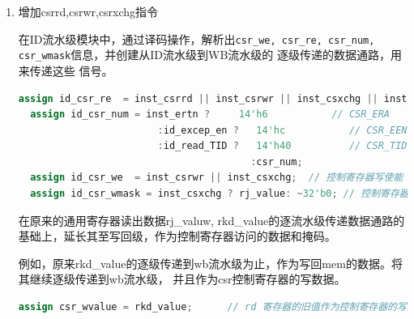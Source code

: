 \documentclass[11pt]{article}
\begin{document}
\begin{enumerate}
\begin{lstlisting}[language=verilog]
/*---------------------------TVAL------------------------------------------------------*/           //add TVAL
assign tcfg_next_value = csr_wmask[31:0] & csr_wvalue[31:0]
                        | ~csr_wmask[31:0] & {csr_tcfg_initval,csr_tcfg_periodic,csr_tcfg_en};      //value of TCFG in the next clk

always @(posedge clk)begin
    if(~resetn)
        timer_cnt <= 32'hffffffff;
    else if(csr_we && csr_num==`CSR_TCFG && tcfg_next_value[`CSR_TCFG_EN])
        timer_cnt <= {tcfg_next_value[`CSR_TCFG_INITV],2'b0};
    else if(csr_tcfg_en && timer_cnt!=32'hffffffff) begin
        if(timer_cnt[31:0]==32'b0 && csr_tcfg_periodic)
            timer_cnt <= {csr_tcfg_initval,2'b0};
        else
            timer_cnt <= timer_cnt -1'b1;
    end
end

assign csr_tval = timer_cnt[31:0];

/*---------------------------TICLR------------------------------------------------------*/           //add TICLR
assign csr_ticlr_clr = 1'b0;
\end{lstlisting}

\item 增加csrrd,csrwr,csrxchg指令

在ID流水级模块中，通过译码操作，解析出\verb|csr_we, csr_re, csr_num, csr_wmask|信息，并创建从ID流水级到WB流水级的
逐级传递的数据通路，用来传递这些
信号。
\begin{lstlisting}[language=verilog]
  assign id_csr_re  = inst_csrrd || inst_csrwr || inst_csxchg || inst_ertn;   // 控制寄存器读使能
  assign id_csr_num = inst_ertn ?     14'h6           // CSR_ERA
                        :id_excep_en ?   14'hc           // CSR_EENTRY
                        :id_read_TID ?   14'h40          // CSR_TID
                                        :csr_num;
  assign id_csr_we  = inst_csrwr || inst_csxchg;  // 控制寄存器写使能
  assign id_csr_wmask = inst_csxchg ? rj_value: ~32'b0; // 控制寄存器写掩码

\end{lstlisting}

在原来的通用寄存器读出数据rj\_valuw, rkd\_value的逐流水级传递数据通路的基础上，延长其至写回级，作为控制寄存器访问的数据和掩码。

例如，原来rkd\_value的逐级传递到wb流水级为止，作为写回mem的数据。将其继续逐级传递到wb流水级，
并且作为csr控制寄存器的写数据。
\begin{lstlisting}[language=verilog]
  assign csr_wvalue = rkd_value;      // rd 寄存器的旧值作为控制寄存器的写数据。
\end{lstlisting}




\end{enumerate}
\end{document}
